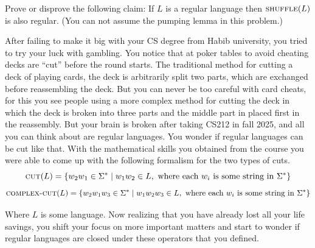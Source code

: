 \documentclass[a4paper]{exam}
\newcommand{\shuffle}{\textsc{shuffle}} %
\newcommand{\cut}{\textsc{cut}} %
\newcommand{\complexcut}{\textsc{complex-cut}} %
\begin{document}
\begin{questions}
    Prove or disprove the following claim: 
    If $L$ is a regular language then $\shuffle(L)$ is also regular.
    (You can not assume the pumping lemma in this problem.)

    \begin{solution}
    \end{solution}

    \question After failing to make it big with your CS degree from Habib university, you tried to try your luck with gambling. 
    You notice that at poker tables to avoid cheating decks are ``cut'' before the round starts. 
    The traditional method for cutting a deck of playing cards, the deck is arbitrarily split two parts, which are exchanged before reassembling the deck.
    But you can never be too careful with card cheats, for this you see people using a more complex method for cutting the deck in which the deck is broken into three parts and the middle part in placed first in the reassembly.
    But your brain is broken after taking CS212 in fall 2025, and all you can think about are regular languages. You wonder if regular languages can be cut like that. With the mathematical skills you obtained from the course you were able to come up with the following formalism for the two types of cuts.
    $$\cut(L) = \{w_2w_1 \in \Sigma^*\mid w_1w_2 \in L, \text{ where each } w_i \text{ is some string in } \Sigma^*\}$$
    $$\complexcut(L) = \{w_2w_1w_3 \in \Sigma^*\mid w_1w_2w_3 \in L, \text{ where each } w_i \text{ is some string in } \Sigma^*\}$$

    Where $L$ is some language. Now realizing that you have already lost all your life savings, you shift your focus on more important matters and start to wonder if regular languages are closed under these operators that you defined.

\end{questions}
\end{document}
